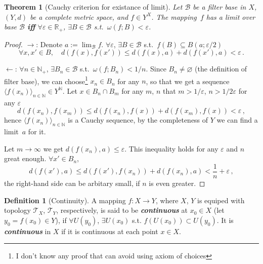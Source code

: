 \documentclass[openany]{book}
\newcommand*{\indexbf}[1]{\emph{\textbf{#1}}\index{#1}} %
\theoremstyle{plain}
\newtheorem{theorem}{Theorem}[section] %
\theoremstyle{definition}
\newtheorem{definition}{Definition}[section] %
\newcommand{\emphbf}[1]{\emph{\textbf{#1}}}
\begin{document}
\begin{theorem}[Cauchy criterion for existance of limit]
	\label{theorem: Cauchy criterion of existance of limit}
	Let $\mathscr B$ be a filter base in $X$, $(Y, d)$ be a complete metric space, and $f \in Y^X$.
	The mapping~$f$ has a limit over base $\mathscr B$ \emphbf{iff}
	$\forall \varepsilon \in \mathbb R_+$, $\exists B \in \mathscr B$ s.t.\ $\omega(f; B) < \varepsilon$.
\end{theorem}
\begin{proof}
	$\to$:
	Denote $a := \lim_{\mathscr B} f$.
	$\forall \varepsilon$, $\exists B \in \mathscr B$ s.t.\ $f(B) \subseteq B(a; \varepsilon/2)$
	\begin{equation*}
		\forall x, x' \in B,\quad
		d(f(x), f(x')) \leq d(f(x), a) + d(f(x'), a) < \varepsilon\,.
	\end{equation*}

	$\gets$:
	$\forall n \in \mathbb N_+$, $\exists B_n \in \mathscr B$ s.t.\ $\omega(f; B_n) < 1/n$. 
	Since $B_n \neq \varnothing$ (the definition of filter base), we can choose\footnote{I don't know any proof that can avoid using axiom of choices} $x_n \in B_n$ for any $n$, so that we get a sequence $\langle f(x_n) \rangle_{n \in \mathbb N} \in Y^\mathbb N$. Let $x \in B_n \cap B_m$ for any $m$, $n$ that $m > 1/\varepsilon$, $n > 1/ 2\varepsilon$ for any $\varepsilon$
	\begin{equation*}
		d(f(x_n), f(x_m)) \leq d(f(x_n), f(x)) + d(f(x_m), f(x)) < \varepsilon\,,
	\end{equation*}
	hence $\langle f(x_n) \rangle_{n \in \mathbb N}$ is a Cauchy sequence, by the completeness of $Y$ we can find a limit~$a$ for it.

	Let $m \to \infty$ we get $d(f(x_n), a) \leq \varepsilon$. This inequality holds for any $\varepsilon$ and $n$ great enough.
	$\forall x' \in B_n$,
	\begin{equation*}
		d(f(x'), a) \leq d(f(x'), f(x_n)) + d(f(x_n), a)
		< \frac 1 n + \varepsilon\,,
	\end{equation*}
	the right-hand side can be arbitary small, if $n$ is even greater.
\end{proof}

\begin{definition}[Continuity]
		\label{definition: continuous}
	A mapping $f \colon X \to Y$, where $X$, $Y$ is equiped with topology $\mathscr T_X$, $\mathscr T_Y$, respectively, is said to be \indexbf{continuous} at $x_0 \in X$ (let $y_0 = f( x_0 ) \in Y$), if $\forall U( y_0 )$, $\exists U( x_0 )$ s.t. $f( U(x_0) )\subset U( y_0 )$. 
	It is \indexbf{continuous} in $X$ if it is continuous at each point $x \in X$. 
\end{definition}
\end{document}
